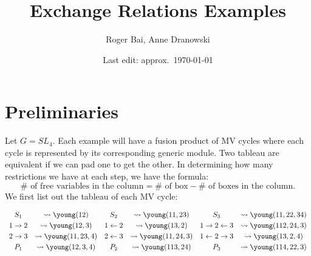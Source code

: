 \documentclass{article}
\title{Exchange Relations Examples}
\author{Roger Bai, Anne Dranowski}
\date{Last edit: approx.\ \today}
\begin{document}
\maketitle
\tableofcontents

\section*{Preliminaries}
Let $G = SL_4$. Each example will have a fusion product of MV cycles where each cycle is represented by its corresponding generic module. Two tableau are equivalent if we can pad one to get the other. In determining how many restrictions we have at each step, we have the formula:
$$ \#\text{ of free variables in the column} = \#\text{ of box} - \#\text{ of boxes in the column}.$$
We first list out the tableau of each MV cycle:

\[\begin{array}{cccccc} \vspace{1mm}
    S_1 &\leadsto \young(12) & S_2 &\leadsto \young(11,23) & S_3 &\leadsto \young(11,22,34) \\ \vspace{1mm}
    1 \rightarrow 2 &\leadsto \young(12,3) & 1 \leftarrow 2 &\leadsto \young(13,2) & 1 \rightarrow 2 \leftarrow 3 &\leadsto \young(112,24,3) \\ \vspace{1mm}
    2 \rightarrow 3 &\leadsto \young(11,23,4) & 2 \leftarrow 3 &\leadsto \young(11,24,3) & 1 \leftarrow 2 \rightarrow 3 &\leadsto \young(13,2,4) \\
    P_1 &\leadsto \young(12,3,4) & P_2 &\leadsto \young(113,24) & P_3 &\leadsto \young(114,22,3)
\end{array}\]
\end{document}
